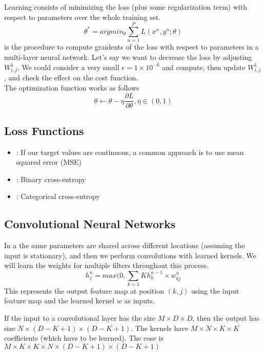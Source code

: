 \documentclass{article}
\begin{document}
Learning consists of minimizing the loss (plus some regularization term) with respect to parameters over the whole training set. $$\theta^{*} = arg min_{\theta} \sum^{P}_{n=1}L(x^{n}, y^n ; \theta)$$  is the procedure to compute graidents of the loss with respect to parameters in a multi-layer neural network. Let's say we want to decrease the loss by adjusting $W^{1}_{i,j}$. We could consider a very small $\epsilon = 1 \times 10^{-6}$ and compute, then update $W^{1}_{i,j}$, and check the effect on the cost function. \\ 

The  optimization function works as follows $$\theta \leftarrow \theta - \eta \frac{\partial L}{\partial \theta}, \eta \in (0,1)$$

\subsection{Loss Functions}

\begin{itemize}
  \item {}: If our target values are continuous, a common approach is to use mean squared error (MSE)
  \item {}: Binary cross-entropy 
  \item {}: Categorical cross-entropy
\end{itemize}

\subsection{Convolutional Neural Networks}

In a  the same parameters are shared across different locations (assuming the input is stationary), and then we perform convolutions with learned kernels. We will learn the weights for multiple filters throughout this process. $$h_{j}^{n} = max(0, \sum_{k=1}{K}h_{k}^{n-1} \times w_{kj}^{n}$$ This represents the output feature map at position $(k,j)$ using the input feature map and the learned kernel $w$ as inputs. \\ 

\begin{remark}
  If the input to a convolutional layer has the size $M \times D \times D$, then the output has size $N \times (D-K+1) \times (D-K+1)$. The kernels have $M \times N \times K \times K$ coefficients (which have to be learned). The cose is $M \times K \times K \times N \times (D-K+1) \times (D-K+1)$
\end{remark}
\end{document}
